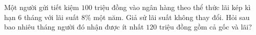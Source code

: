\begin{ex}
Một người gửi tiết kiệm $100$ triệu đồng vào ngân hàng theo thể thức lãi kép kì hạn $6$ tháng với lãi suất $8\%$ một năm. Giả sử lãi suất không thay đổi. Hỏi sau bao nhiêu tháng người đó nhận được ít nhất $120$ triệu đồng gồm cả gốc và lãi?
\end{ex}
